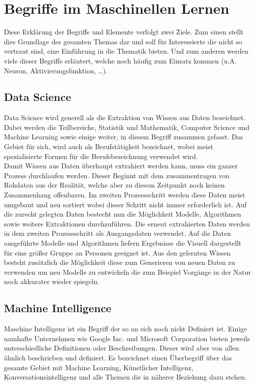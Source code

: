 \chapter{Begriffe im Maschinellen Lernen}
\label{cha:Begriffe}

Diese Erklärung der Begriffe und Elemente verfolgt zwei Ziele.
Zum einen stellt dies Grundlage des gesamten Themas dar und soll für Interessierte die nicht so vertraut sind, eine Einführung in die Thematik bieten. 
Und zum anderen werden viele dieser Begriffe erläutert, welche noch häufig zum Einsatz kommen (u.A. Neuron, Aktivierungsfunktion, …).

\section{Data Science}

Data Science wird generell als die Extraktion von Wissen aus Daten bezeichnet. 
Dabei werden die Teilbereiche, Statistik und Mathematik, Computer Science und Machine Learning sowie einige weiter, in diesem Begriff zusammen gefasst. 
Das Gebiet für sich, wird auch als Berufstätigkeit bezeichnet, wobei meist spezialisierte Formen für die Berufsbezeichnung verwendet wird.\\

Damit Wissen aus Daten überhaupt extrahiert werden kann, muss ein ganzer Prozess durchlaufen werden. 
Dieser Beginnt mit dem zusammentragen von Rohdaten aus der Realität, welche aber zu diesem Zeitpunkt noch keinen Zusammenhang offenbaren. 
Im zweiten Prozessschritt werden diese Daten meist umgebaut und neu sortiert wobei dieser Schritt nicht immer erforderlich ist. 
Auf die  zurecht gelegten Daten bestecht nun die Möglichkeit Modelle, Algorithmen sowie weitere Extraktionen durchzuführen. 
Die erneut extrahierten Daten werden in dem zweiten Prozessschritt als Ausgangsdaten verwendet. 
Auf die Daten ausgeführte Modelle und Algorithmen liefern Ergebnisse die Visuell dargestellt für eine größer Gruppe an Personen geeignet ist. 
Aus den gelernten Wissen besteht zusätzlich die Möglichkeit diese zum Generieren von neuen Daten zu verwenden um neu Modelle zu entwickeln die zum Beispiel Vorgänge in der Natur noch akkurater wieder spiegeln.

\section{Machine Intelligence}

Maschine Intelligenz ist ein Begriff der so an sich noch nicht Definiert ist. 
Einige namhafte Unternehmen wie Google Inc. und Microsoft Corporation bieten jeweils unterschiedliche Definitionen oder Beschreibungen. 
Dieser wird aber von allen ähnlich beschrieben und definiert. 
Es bezeichnet einen Überbegriff über das gesamte Gebiet mit Machine Learning, Künstlicher Intelligenz, Konversationsintelligenz und alle Themen die in näherer Beziehung dazu stehen. 

